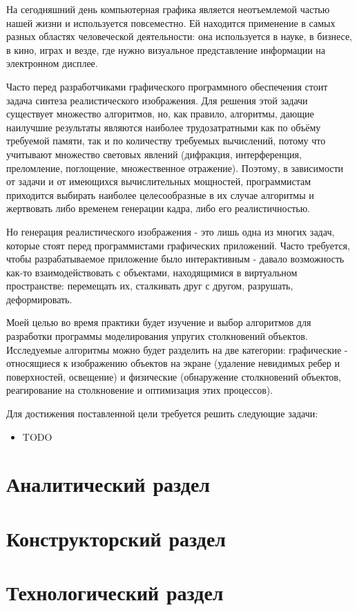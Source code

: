 \fontsize{14pt}{14pt}\selectfont


На сегодняшний день компьютерная графика является неотъемлемой частью
нашей жизни и используется повсеместно. Ей находится применение в самых разных
областях человеческой деятельности: она используется в науке, в бизнесе, в
кино, играх и везде, где нужно визуальное представление информации на
электронном дисплее.

Часто перед разработчиками графического программного обеспечения
стоит задача синтеза реалистического изображения. Для решения этой задачи
существует множество алгоритмов, но, как правило, алгоритмы, дающие наилучшие
результаты являются наиболее трудозатратными как по объёму требуемой памяти,
так и по количеству требуемых вычислений, потому что учитывают множество
световых явлений (дифракция, интерференция, преломление, поглощение,
множественное отражение). Поэтому, в зависимости от задачи и от имеющихся
вычислительных мощностей, программистам приходится выбирать наиболее
целесообразные в их случае алгоритмы и жертвовать либо временем генерации
кадра, либо его реалистичностью.

Но генерация реалистического изображения - это лишь одна из многих
задач, которые стоят перед программистами графических приложений. Часто
требуется, чтобы разрабатываемое приложение было интерактивным - давало
возможность как-то взаимодействовать с объектами, находящимися в виртуальном
пространстве: перемещать их, сталкивать друг с другом, разрушать,
деформировать.

Моей целью во время практики будет изучение и выбор алгоритмов для
разработки программы моделирования упругих столкновений объектов. Исследуемые
алгоритмы можно будет разделить на две категории: графические - относящиеся к
изображению объектов на экране (удаление невидимых ребер и поверхностей,
освещение) и физические (обнаружение столкновений объектов, реагирование на
столкновение и оптимизация этих процессов). %

Для достижения поставленной цели требуется решить следующие задачи:

\begin{itemize}
    \item TODO
\end{itemize}
\newpage
\section{Аналитический раздел}

\newpage
\section{Конструкторский раздел}

\newpage
\section{Технологический раздел}

\newpage
{}

\newpage
{}

\newpage
{}
